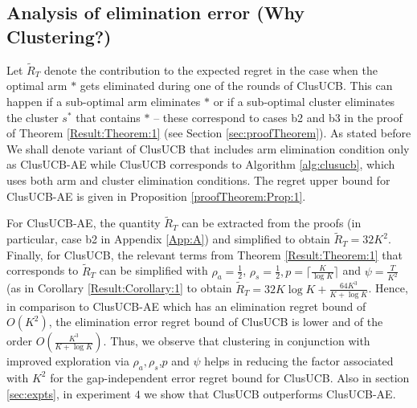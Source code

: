 

\subsection*{Analysis of elimination error (Why Clustering?)}
Let $\widetilde R_T$ denote the contribution  to the expected regret in the case when the optimal arm $*$ gets eliminated during one of the rounds of ClusUCB. This can happen if a sub-optimal arm eliminates $*$ or if a sub-optimal cluster eliminates the cluster $s^*$ that contains $*$ -- these correspond to cases b2 and b3 in the proof of Theorem \ref{Result:Theorem:1} (see Section \ref{sec:proofTheorem}). 
As stated before We shall denote variant of ClusUCB that includes arm elimination condition only as ClusUCB-AE while ClusUCB corresponds to Algorithm \ref{alg:clusucb}, which uses both arm and cluster elimination conditions. The regret upper bound for ClusUCB-AE is given in Proposition \ref{proofTheorem:Prop:1}.

For ClusUCB-AE, the quantity $\widetilde R_T$ can be extracted from the proofs (in particular, case b2 in Appendix \ref{App:A}) and simplified to obtain $\widetilde R_T = 32K^2 $. Finally, for ClusUCB, the relevant terms from Theorem \ref{Result:Theorem:1} that corresponds to $\widetilde R_T$ can be simplified with $\rho_{a}=\frac{1}{2}$, $\rho_{s}=\frac{1}{2},p=\big\lceil \frac{K}{\log K} \big\rceil$ and $\psi=\frac{T}{K^2}$ (as in Corollary \ref{Result:Corollary:1} to obtain  
$\tilde R_T = 32K\log K + \frac{64 K^3}{K+\log K}$. Hence, in comparison to ClusUCB-AE which has an elimination regret bound of $O(K^2)$, the elimination error regret bound of ClusUCB is lower and of the order $O\left(\frac{ K^3}{K+\log K}\right)$. Thus, we observe that clustering in conjunction with improved exploration via $\rho_{a},\rho_{s}$,$p$ and $\psi$ helps in reducing the factor associated with $K^2$ for the gap-independent error regret bound for ClusUCB. Also in section \ref{sec:expts}, in experiment $4$ we show that ClusUCB outperforms ClusUCB-AE. 

